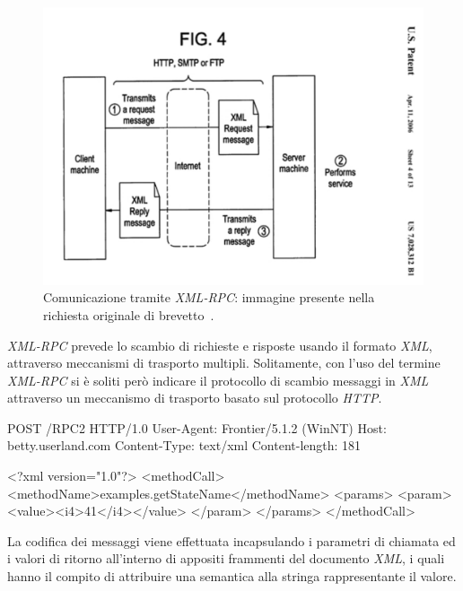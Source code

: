 \begin{figure}[h]
\centering
\includegraphics[scale=0.5, viewport=0 0 646 440]{Immagini/Capitolo3/XMLRPC-patent.pdf}
\caption[Comunicazione tramite \emph{XML-RPC}]{Comunicazione tramite \emph{XML-RPC}: immagine presente nella richiesta originale di brevetto~\cite{MERRICK:2006:misc}.}\label{fig:xmlrpc-patent}
\end{figure}

\emph{XML-RPC} prevede lo scambio di richieste e risposte usando il formato \emph{XML}, attraverso meccanismi di trasporto multipli. Solitamente, con l'uso del termine \emph{XML-RPC} si è soliti però indicare il protocollo di scambio messaggi in \emph{XML} attraverso un meccanismo di trasporto basato sul protocollo \emph{HTTP}.

\begin{program}
\begin{verbatimtab}

POST /RPC2 HTTP/1.0
User-Agent: Frontier/5.1.2 (WinNT)
Host: betty.userland.com
Content-Type: text/xml
Content-length: 181


<?xml version="1.0"?>
<methodCall>
   <methodName>examples.getStateName</methodName>
   <params>
      <param>
         <value><i4>41</i4></value>
         </param>
      </params>
   </methodCall>
\end{verbatimtab}
\caption{Esempio di chiamata ad una procedura remota usando \emph{XML-RPC over HTTP}}\label{code:xmlrpc-request}
\end{program}

La codifica dei messaggi viene effettuata incapsulando i parametri di chiamata ed i valori di ritorno all'interno di appositi frammenti del documento \emph{XML}, i quali hanno il compito di attribuire una semantica alla stringa rappresentante il valore.

